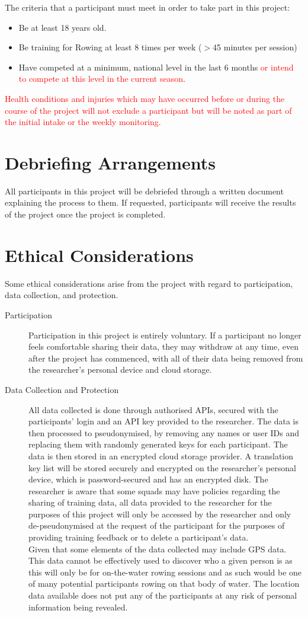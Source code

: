 The criteria that a participant must meet in order to take part in this project:
\begin{itemize}
    \item Be at least 18 years old.
    \item Be training for Rowing at least 8 times per week ($>$45 minutes per session)
    \item Have competed at a minimum, national level in the last 6 months \textcolor{red}{or intend to compete at this level in the current season}.
\end{itemize}
\textcolor{red}{Health conditions and injuries which may have occurred before or during the course of the project will not exclude a participant but will be noted as part of the initial intake or the weekly monitoring.}

\section*{Debriefing Arrangements}
All participants in this project will be debriefed through a written document explaining the process to them. If requested, participants will receive the results of the project once the project is completed.
\section*{Ethical Considerations}
Some ethical considerations arise from the project with regard to participation, data collection, and protection.
\begin{description}
    \item [Participation] Participation in this project is entirely voluntary. If a participant no longer feels comfortable sharing their data, they may withdraw at any time, even after the project has commenced, with all of their data being removed from the researcher's personal device and cloud storage.
    \item [Data Collection and Protection] All data collected is done through authorised APIs, secured with the participants' login and an API key provided to the researcher. The data is then processed to pseudonymised, by removing any names or user IDs and replacing them with randomly generated keys for each participant. The data is then stored in an encrypted cloud storage provider. A translation key list will be stored securely and encrypted on the researcher's personal device, which is password-secured and has an encrypted disk. The researcher is aware that some squads may have policies regarding the sharing of training data, all data provided to the researcher for the purposes of this project will only be accessed by the researcher and only de-pseudonymised at the request of the participant for the purposes of providing training feedback or to delete a participant's data. \\
    Given that some elements of the data collected may include GPS data. This data cannot be effectively used to discover who a given person is as this will only be for on-the-water rowing sessions and as such would be one of many potential participants rowing on that body of water. The location data available does not put any of the participants at any risk of personal information being revealed.
\end{description}
